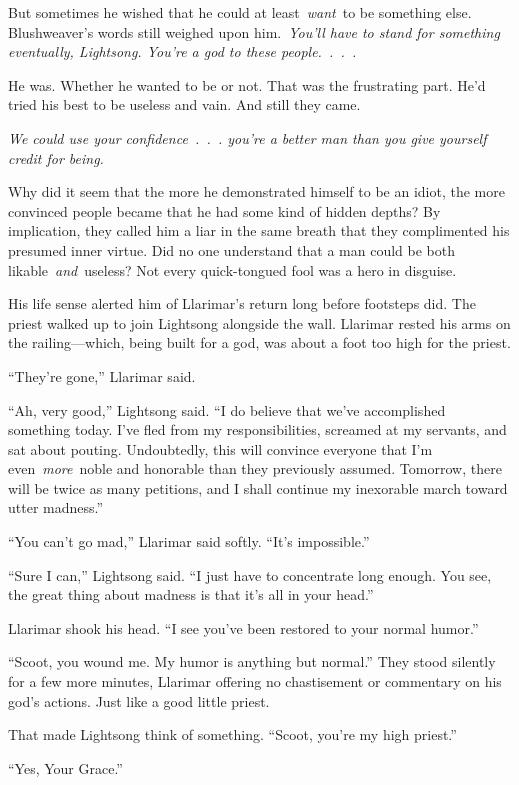 But sometimes he wished that he could at least~\textit{want}~to be something else. Blushweaver’s words still weighed upon him.~\textit{You’ll have to stand for something eventually, Lightsong. You’re a god to these people.~.~.~.}

He was. Whether he wanted to be or not. That was the frustrating part. He’d tried his best to be useless and vain. And still they came.

\textit{We could use your confidence~.~.~. you’re a better man than you give yourself credit for being.}

Why did it seem that the more he demonstrated himself to be an idiot, the more convinced people became that he had some kind of hidden depths? By implication, they called him a liar in the same breath that they complimented his presumed inner virtue. Did no one understand that a man could be both likable~\textit{and}~useless? Not every quick-tongued fool was a hero in disguise.

His life sense alerted him of Llarimar’s return long before footsteps did. The priest walked up to join Lightsong alongside the wall. Llarimar rested his arms on the railing—which, being built for a god, was about a foot too high for the priest.

“They’re gone,” Llarimar said.

“Ah, very good,” Lightsong said. “I do believe that we’ve accomplished something today. I’ve fled from my responsibilities, screamed at my servants, and sat about pouting. Undoubtedly, this will convince everyone that I’m even~\textit{more}~noble and honorable than they previously assumed. Tomorrow, there will be twice as many petitions, and I shall continue my inexorable march toward utter madness.”

“You can’t go mad,” Llarimar said softly. “It’s impossible.”

“Sure I can,” Lightsong said. “I just have to concentrate long enough. You see, the great thing about madness is that it’s all in your head.”

Llarimar shook his head. “I see you’ve been restored to your normal humor.”

“Scoot, you wound me. My humor is anything but normal.” They stood silently for a few more minutes, Llarimar offering no chastisement or commentary on his god’s actions. Just like a good little priest.

That made Lightsong think of something. “Scoot, you’re my high priest.”

“Yes, Your Grace.”

